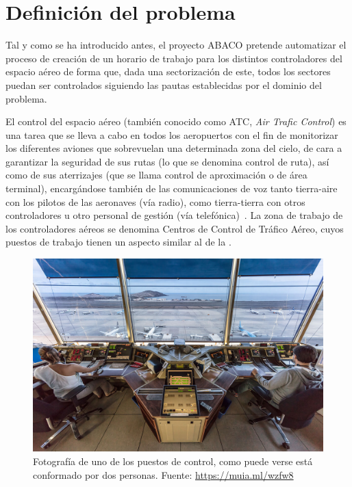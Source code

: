 \graphicspath{{capitulos/Capitulo2-Definicion-del-problema/recursos/}}

\section{Definición del problema} \label{apartado:2}

Tal y como se ha introducido antes, el proyecto ABACO pretende automatizar el proceso de creación de un horario de trabajo para
los distintos controladores del espacio aéreo de forma que, dada una sectorización de este, todos los sectores puedan ser
controlados siguiendo las pautas establecidas por el dominio del problema.

El control del espacio aéreo (también conocido como ATC, \textit{Air Trafic Control}) es una tarea que se lleva a cabo
en todos los aeropuertos con el fin de monitorizar los diferentes aviones que sobrevuelan una determinada zona del cielo,
de cara a garantizar la seguridad de sus rutas (lo que se denomina control de ruta), así como de sus aterrizajes
(que se llama control de aproximación o de área terminal), encargándose también de las comunicaciones de voz tanto
tierra-aire con los pilotos de las aeronaves (vía radio), como tierra-tierra con otros controladores u otro personal
de gestión (vía telefónica)~\cite{ENAIRE-web}.
La zona de trabajo de los controladores aéreos se denomina Centros de Control de Tráfico Aéreo, cuyos puestos de trabajo tienen
un aspecto similar al de la .

\begin{figure}[htbp]
    \centering
    \includegraphics[width=0.7\linewidth]{ENAIRE-ATC}
    \caption{Fotografía de uno de los puestos de control, como puede verse está conformado por dos personas. Fuente: \url{https://muia.ml/wzfw8}}
    \label{fig:2:enaire-atc}
\end{figure}


